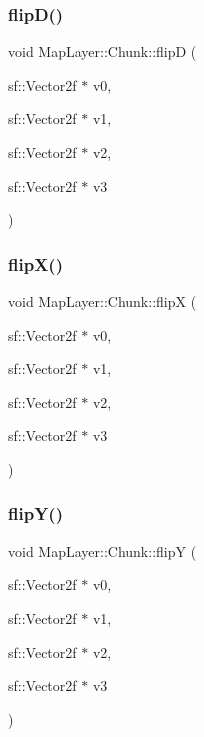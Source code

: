 \mbox{\label{classMapLayer_1_1Chunk_a82346cb03113d15eb2b135c082257b0e}} 
\subsubsection{\texorpdfstring{flip\+D()}{flipD()}}
{\footnotesize\ttfamily void Map\+Layer\+::\+Chunk\+::flipD (\begin{DoxyParamCaption}\item[{sf\+::\+Vector2f $\ast$}]{v0,  }\item[{sf\+::\+Vector2f $\ast$}]{v1,  }\item[{sf\+::\+Vector2f $\ast$}]{v2,  }\item[{sf\+::\+Vector2f $\ast$}]{v3 }\end{DoxyParamCaption})\hspace{0.3cm}{\ttfamily [inline]}}

\mbox{\label{classMapLayer_1_1Chunk_a0bd785f9c54b97ae99417261210b9579}} 
\subsubsection{\texorpdfstring{flip\+X()}{flipX()}}
{\footnotesize\ttfamily void Map\+Layer\+::\+Chunk\+::flipX (\begin{DoxyParamCaption}\item[{sf\+::\+Vector2f $\ast$}]{v0,  }\item[{sf\+::\+Vector2f $\ast$}]{v1,  }\item[{sf\+::\+Vector2f $\ast$}]{v2,  }\item[{sf\+::\+Vector2f $\ast$}]{v3 }\end{DoxyParamCaption})\hspace{0.3cm}{\ttfamily [inline]}}

\mbox{\label{classMapLayer_1_1Chunk_a6de781e426b23c3b33e34a1ea70eb14f}} 
\subsubsection{\texorpdfstring{flip\+Y()}{flipY()}}
{\footnotesize\ttfamily void Map\+Layer\+::\+Chunk\+::flipY (\begin{DoxyParamCaption}\item[{sf\+::\+Vector2f $\ast$}]{v0,  }\item[{sf\+::\+Vector2f $\ast$}]{v1,  }\item[{sf\+::\+Vector2f $\ast$}]{v2,  }\item[{sf\+::\+Vector2f $\ast$}]{v3 }\end{DoxyParamCaption})\hspace{0.3cm}{\ttfamily [inline]}}

